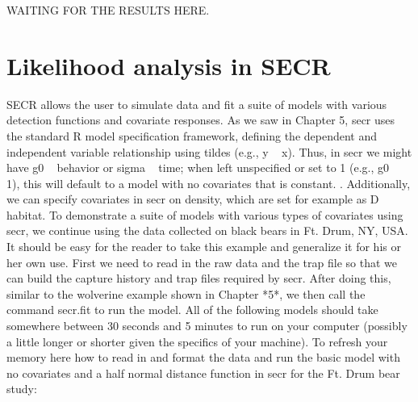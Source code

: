 WAITING FOR THE RESULTS HERE.  

\section{Likelihood analysis in SECR}

SECR allows the user to simulate data and fit a suite of models with various detection functions and covariate responses.  As we saw in Chapter 5, secr uses the standard R model specification framework, defining the dependent and independent variable relationship using tildes (e.g., y ~ x). Thus, in secr we might have g0 ~ behavior or sigma ~ time; when left unspecified or set to 1 (e.g., g0 ~ 1), this will default to a model with no covariates that is constant.  .  Additionally, we can specify covariates in secr on density, which are set for example as D ~ habitat.
To demonstrate a suite of models with various types of covariates using secr, we continue using the data collected on black bears in Ft. Drum, NY, USA.  It should be easy for the reader to take this example and generalize it for his or her own use.   First we need to read in the raw data and the trap file so that we can build the capture history and trap files required by secr.  After doing this, similar to the wolverine example shown in Chapter *5*, we then call the command secr.fit to run the model.  All of the following models should take somewhere between 30 seconds and 5 minutes to run on your computer (possibly a little longer or shorter given the specifics of your machine).    To refresh your memory here how to read in and format the data and run the basic model with no covariates and a half normal distance function in secr for the Ft. Drum bear study:
